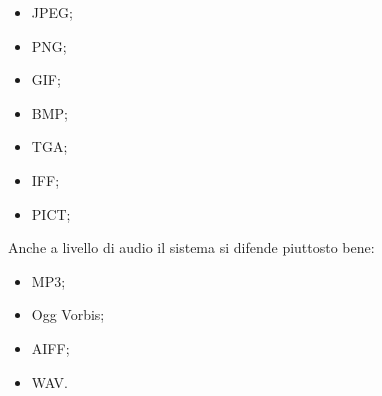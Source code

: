 \begin{multicols}{3}
	\begin{itemize}
	\item JPEG;
	\item PNG;
	\item GIF;
	\item BMP;
	\item TGA;
	\item IFF;
	\item PICT;
\end{itemize}
\end{multicols}

Anche a livello di audio il sistema si difende piuttosto bene: 
\begin{multicols}{2}
	\begin{itemize}
		\item MP3;
		\item Ogg Vorbis;
		\item AIFF;
		\item WAV.
	\end{itemize}
\end{multicols}

